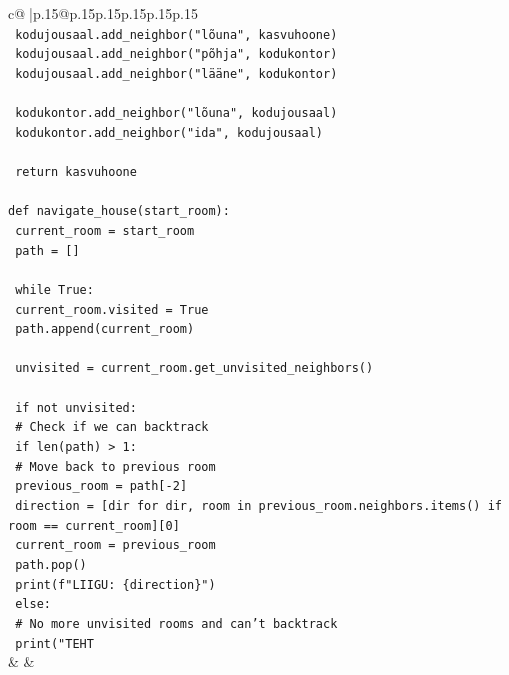 \documentclass{article}
\begin{document}
{\begin{supertabular}{c@{$\;$}|p{.15\linewidth}@{}p{.15\linewidth}p{.15\linewidth}p{.15\linewidth}p{.15\linewidth}p{.15\linewidth}}
{{{\\ 
\texttt{    kodujousaal.add\_neighbor("lõuna", kasvuhoone)} \\
\texttt{    kodujousaal.add\_neighbor("põhja", kodukontor)} \\
\texttt{    kodujousaal.add\_neighbor("lääne", kodukontor)} \\
\\ 
\texttt{    kodukontor.add\_neighbor("lõuna", kodujousaal)} \\
\texttt{    kodukontor.add\_neighbor("ida", kodujousaal)} \\
\\ 
\texttt{    return kasvuhoone} \\
\\ 
\texttt{def navigate\_house(start\_room):} \\
\texttt{    current\_room = start\_room} \\
\texttt{    path = {[}{]}} \\
\\ 
\texttt{    while True:} \\
\texttt{        current\_room.visited = True} \\
\texttt{        path.append(current\_room)} \\
\\ 
\texttt{        unvisited = current\_room.get\_unvisited\_neighbors()} \\
\\ 
\texttt{        if not unvisited:} \\
\texttt{            \# Check if we can backtrack} \\
\texttt{            if len(path) > 1:} \\
\texttt{                \# Move back to previous room} \\
\texttt{                previous\_room = path{[}{-}2{]}} \\
\texttt{                direction = {[}dir for dir, room in previous\_room.neighbors.items() if room == current\_room{]}{[}0{]}} \\
\texttt{                current\_room = previous\_room} \\
\texttt{                path.pop()} \\
\texttt{                print(f"LIIGU: \{direction\}")} \\
\texttt{            else:} \\
\texttt{                \# No more unvisited rooms and can't backtrack} \\
\texttt{                print("TEHT} \\
            }
        }
    }
    & & \\ \\


\end{supertabular}}
\end{document}
